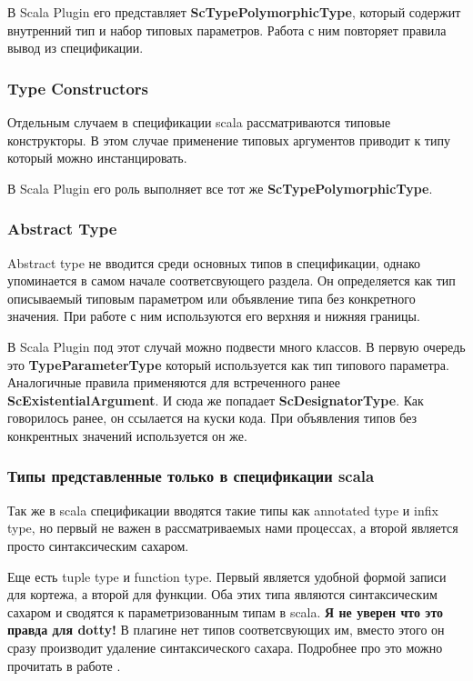 В Scala Plugin его представляет \textbf{ScTypePolymorphicType}, который содержит
внутренний тип и набор типовых параметров.
Работа с ним повторяет правила вывод из спецификации.

\subsubsection{Type Constructors}
Отдельным случаем в спецификации scala рассматриваются типовые конструкторы.
В этом случае применение типовых аргументов приводит к типу который можно
инстанцировать.

В Scala Plugin его роль выполняет все тот же \textbf{ScTypePolymorphicType}.

\subsubsection{Abstract Type}

Abstract type не вводится среди основных типов в спецификации, однако упоминается
в самом начале соответсвующего раздела.
Он определяется как тип описываемый типовым параметром или объявление типа без
конкретного значения.
При работе с ним используются его верхняя и нижняя границы.

В Scala Plugin под этот случай можно подвести много классов.
В первую очередь это \textbf{TypeParameterType} который используется как тип
типового параметра.
Аналогичные правила применяются для встреченного ранее
\textbf{ScExistentialArgument}.
И сюда же попадает \textbf{ScDesignatorType}.
Как говорилось ранее, он ссылается на куски кода.
При объявления типов без конкрентных значений используется он же.

\subsubsection{Типы представленные только в спецификации scala}
Так же в scala спецификации вводятся такие типы как annotated type и infix type,
но первый не важен в рассматриваемых нами процессах, а второй является просто
синтаксическим сахаром.

Еще есть tuple type и function type.
Первый является удобной формой записи для кортежа, а второй для функции.
Оба этих типа являются синтаксическим сахаром и сводятся к параметризованным
типам в scala.
\textbf{Я не уверен что это правда для dotty!}
В плагине нет типов соответсвующих им, вместо этого он сразу производит
удаление синтаксического сахара.
Подробнее про это можно прочитать в работе \cite{kozlov}.


